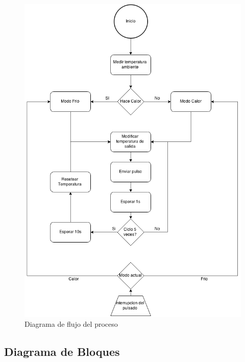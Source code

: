 \documentclass[10pt,spanish,a4paper,openany,notitlepage]{article}
\begin{document}
\begin{figure}[H] %
\begin{center}
\includegraphics[scale=0.65]{./imagenes/diagrama_de_flujo.png}
\caption{Diagrama de flujo del proceso}
 \label{fig:diag_flujo}
\end{center}
\end{figure}

\subsection{Diagrama de Bloques}
\end{document}
